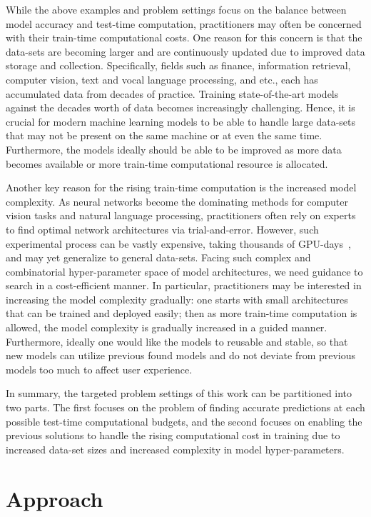 While the above examples and problem settings focus on the balance between model accuracy and test-time computation, practitioners may often be concerned with their train-time computational costs. 
One reason for this concern is that the data-sets are becoming larger and are continuously updated due to improved data storage and collection. Specifically, fields such as finance, information retrieval, computer vision, text and vocal language processing, and etc., each has accumulated data from decades of practice. Training state-of-the-art models against the decades worth of data becomes increasingly challenging. Hence, it is crucial for modern machine learning models to be able to handle large data-sets that may not be present on the same machine or at even the same time. Furthermore, the models ideally should be able to be improved as more data becomes available or more train-time computational resource is allocated. 

Another key reason for the rising train-time computation is the increased model complexity. As neural networks become the dominating methods for 
computer vision tasks and natural language processing, practitioners often rely on experts to find optimal network architectures via trial-and-error. However, such experimental process can be vastly expensive, taking thousands of GPU-days~\citep{nas}, and may yet generalize to general data-sets. Facing such complex and combinatorial hyper-parameter space of model architectures, we need guidance to search in a cost-efficient manner. In particular, practitioners may be interested in increasing the model complexity gradually: one starts with small architectures that can be trained and deployed easily; then as more train-time computation is allowed, the model complexity is gradually increased in a guided manner. Furthermore, ideally one would like the models to reusable and stable, so that new models can utilize previous found models and do not deviate from previous models too much to affect user experience. 

In summary, the targeted problem settings of this work can be partitioned into two parts. The first focuses on the problem of finding accurate predictions at each possible test-time computational budgets, and the second focuses on enabling the previous solutions to handle the rising computational cost in training due to increased data-set sizes and increased complexity in model hyper-parameters. 

\section{Approach}

